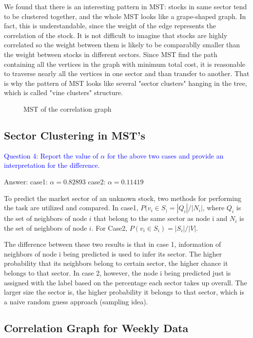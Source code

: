\documentclass[11pt]{article}
\makeatletter
\def\maxwidth{\ifdim\Gin@nat@width>\linewidth\linewidth
    \else\Gin@nat@width\fi}
\let\Oldincludegraphics\includegraphics
\renewcommand{\includegraphics}[1]{\Oldincludegraphics[width=.8\maxwidth]{#1}}
\makeatother
\begin{document}
We found that there is an interesting pattern in MST: stocks in same sector tend to be clustered together, and the whole MST looks like a grape-shaped graph. In fact, this is understandable, since the weight of the edge represents the correlation of the stock. It is not difficult to imagine that stocks are highly correlated so the weight between them is likely to be comparablly smaller than the weight between stocks in different sectors. Since MST find the path containing all the vertices in the graph with minimum total cost, it is reasonable to traverse nearly all the vertices in one sector and than transfer to another. That is why the pattern of MST looks like several "sector clusters" hanging in the tree, which is called "vine clusters" structure.
\begin{figure}[h]
\centering
{}
\caption{MST of the correlation graph}
\label{fig:Q3}
\end{figure}

\subsection{Sector Clustering in MST's}
\textcolor{blue}{Question 4: Report the value of $\alpha$ for the above two cases and provide an interpretation for the difference.
}

Answer:
case1: $\alpha = 0.82893$
case2: $\alpha = 0.11419$

To predict the market sector of an unknown stock, two methods for performing the task are utilized and compared. In case1, $P(v_i \in S_) = |Q_i| / |N_i|$, where $Q_i$ is the set of neighbors of node $i$ that belong to the same sector as node i and $N_i$ is the set of neighbors of node $i$. For Case2, $P(v_i \in S_i) = |S_i| / |V|$. 

The difference between these two results is that in case 1, information of neighbors of node i being predicted is used to infer its sector. The higher probability that its neighbors belong to certain sector, the higher chance it belongs to that sector. In case 2, however, the node i being predicted just is assigned with the label based on the percentage each sector takes up overall. The larger size the sector is, the higher probability it belongs to that sector, which is a naive random guess approach (sampling idea).



\subsection{Correlation Graph for Weekly Data}
\end{document}
